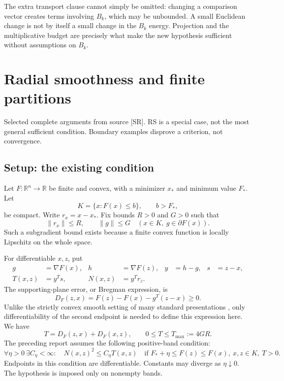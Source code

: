 \documentclass[10pt,oneside,openany]{book}
\newcommand{\ModuleTag}{I}
\theoremstyle{remark}\newtheorem{remark}{Remark}[chapter]
\renewcommand{\thetheorem}{\ModuleTag.\arabic{theorem}}
\renewcommand{\thelemma}{\ModuleTag.\arabic{lemma}}
\renewcommand{\thecorollary}{\ModuleTag.\arabic{corollary}}
\renewcommand{\theproposition}{\ModuleTag.\arabic{proposition}}
\renewcommand{\theremark}{\ModuleTag.\arabic{remark}}
\newcommand{\StartModule}[3]{\cleardoublepage\renewcommand{\ModuleTag}{#1}\chapter{#2}\label{#1:chapter}\begin{small}\color{Accent}#3\end{small}\par\vspace{3pt}{\color{RuleGray}\hrule}\vspace{9pt}}
\begin{document}
The extra transport clause cannot simply be omitted: changing a comparison vector creates terms involving $B_k$, which may be unbounded. A small Euclidean change is not by itself a small change in the $B_k$ energy. Projection and the multiplicative budget are precisely what make the new hypothesis sufficient without assumptions on $B_k$.


\endgroup


\StartModule{R}{Radial smoothness and finite partitions}{Selected complete arguments from source [SR]. RS is a special case, not the most general sufficient condition. Boundary examples disprove a criterion, not convergence.}

\begingroup
\providecommand{\R}{}
\renewcommand{\R}{\mathbb R}
\providecommand{\ip}{}
\renewcommand{\ip}[2]{\langle #1,#2\rangle}
\providecommand{\DF}{}
\renewcommand{\DF}{D_F}
\providecommand{\st}{}
\renewcommand{\st}{x_*}
\providecommand{\fs}{}
\renewcommand{\fs}{F_*}
\makeatletter\let\c@lemma\c@theorem\let\c@corollary\c@theorem\let\c@proposition\c@theorem\let\c@remark\c@theorem\makeatother
\renewcommand{\thelemma}{\thetheorem}\renewcommand{\thecorollary}{\thetheorem}\renewcommand{\theproposition}{\thetheorem}\renewcommand{\theremark}{\thetheorem}
\renewcommand{\thetheorem}{R.\arabic{section}.\arabic{theorem}}
\setcounter{section}{0}
\setcounter{theorem}{0}
\setcounter{equation}{0}
\section{Setup: the existing condition}
Let $F:\R^n\to\R$ be finite and convex, with a minimizer $\st$ and minimum value $\fs$. Let
\[
 K=\{x:F(x)\le b\},\qquad b>\fs,
\]
be compact. Write $r_x=x-\st$. Fix bounds $R>0$ and $G>0$ such that
\[
 \|r_x\|\le R,\qquad \|g\|\le G\quad(x\in K,\ g\in\partial F(x)).
\]
Such a subgradient bound exists because a finite convex function is locally Lipschitz on the whole space.

For differentiable $x,z$, put
\begin{align*}
 g&=\nabla F(x),& h&=\nabla F(z),&y&=h-g,&s&=z-x,\\
 T(x,z)&=y^Ts,&N(x,z)&=y^Tr_z.
\end{align*}
The supporting-plane error, or Bregman expression, is
\[
 \DF(z,x)=F(z)-F(x)-g^T(z-x)\ge0.
\]
Unlike the strictly convex smooth setting of many standard presentations \cite{BB}, only differentiability of the second endpoint is needed to define this expression here. We have
\[
 T=\DF(z,x)+\DF(x,z),\qquad 0\le T\le T_{\max}:=4GR.
\]
The preceding report assumes the following positive-band condition:
\begin{equation}
 \forall\eta>0\ \exists C_\eta<\infty:\quad
 N(x,z)^2\le C_\eta T(x,z)
 \quad\text{if }\fs+\eta\le F(z)\le F(x),\ x,z\in K,\ T>0.
 \tag{R.RS}\label{R:eq:RS}
\end{equation}
Endpoints in this condition are differentiable. Constants may diverge as $\eta\downarrow0$. The hypothesis is imposed only on nonempty bands.
\end{document}
